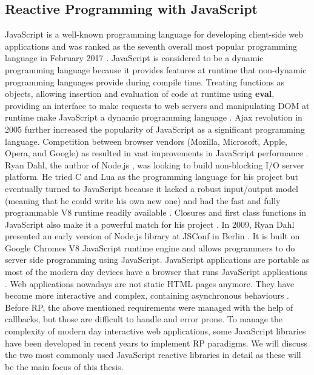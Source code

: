 \subsection{Reactive Programming with JavaScript}
JavaScript is a well-known programming language for developing client-side web applications and was ranked as the seventh overall most popular
programming language in February 2017 \cite{TiobeIndex}. JavaScript is considered to be a dynamic programming language because it provides features at runtime that non-dynamic programming languages provide during compile time. 
Treating functions as objects, allowing insertion and evaluation of code at runtime using \textbf{eval}, providing an interface to make requests to web servers and manipulating DOM at runtime make JavaScript a dynamic programming language \cite{White2010}. Ajax revolution in 2005 further increased the popularity of JavaScript as a significant programming language. Competition between browser vendors (Mozilla, Microsoft, Apple, Opera, and Google) as resulted in vast improvements in JavaScript performance \cite{cantelon2014node.js}. Ryan Dahl, the author of Node.js \cite{NodeJs}, was looking to build non-blocking I/O server platform. He tried C and Lua as the programming language for his project but eventually turned to JavaScript because it lacked a robust input/output model (meaning that he could write his own new one) and had the fast and fully programmable V8 runtime readily available \cite{9780321910578}. Closures and first class functions in JavaScript also make it a powerful match for his project \cite{teixeira2012professional}. In 2009, Ryan Dahl presented an early version of Node.js library at JSConf in Berlin \cite{JSConfNodeJS}. It is built on Google Chrome\textquotesingle s V8 JavaScript runtime engine and allows programmers to do server side programming using JavaScript. JavaScript applications are portable as most of the modern day devices have a browser that runs JavaScript applications \cite{Richards:2010:ADB:1809028.1806598}.
Web applications nowadays are not static HTML pages anymore. They have become more interactive and complex, containing asynchronous behaviours \cite{6068340}. Before RP, the above mentioned requirements were managed with the help of callbacks, but those are difficult to handle and error prone. To manage the complexity of modern day interactive web applications, some JavaScript libraries have been developed in recent years to implement RP paradigms. We will discuss the two most commonly used JavaScript reactive libraries in detail as these will be the main focus of this thesis.

